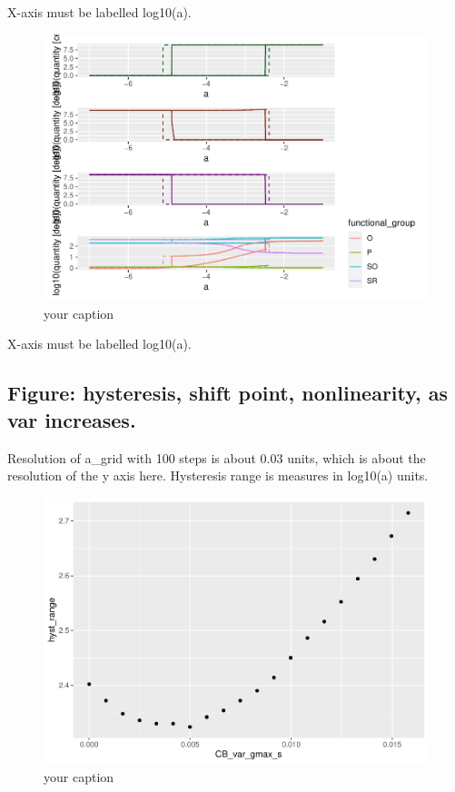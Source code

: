 \documentclass{article}
\begin{document}
X-axis must be labelled log10(a).

\begin{figure}

{\centering \includegraphics[width=1\linewidth]{article_files/figure-latex/ss_var2-1} 

}

\caption{your caption}\label{fig:ss_var2}
\end{figure}

X-axis must be labelled log10(a).

\hypertarget{figure-hysteresis-shift-point-nonlinearity-as-var-increases.}{%
\subsection{Figure: hysteresis, shift point, nonlinearity, as var
increases.}\label{figure-hysteresis-shift-point-nonlinearity-as-var-increases.}}

Resolution of a\_grid with 100 steps is about 0.03 units, which is about
the resolution of the y axis here. Hysteresis range is measures in
log10(a) units.

\begin{figure}

{\centering \includegraphics[width=1\linewidth]{article_files/figure-latex/ss_var3-1} 

}

\caption{your caption}\label{fig:ss_var3}
\end{figure}
\end{document}
